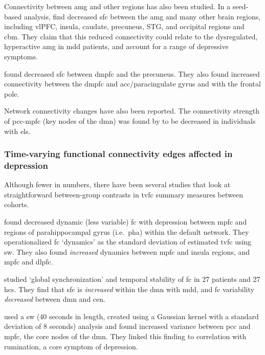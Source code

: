 Connectivity between \gls{amg} and other regions has also been studied.
In a seed-based analysis, \textcite{Ramasubbu2014} find decreased \gls{sfc} between the \gls{amg} and many other brain regions, including vlPFC, insula, caudate, precuneus, STG, and occipital regions and \gls{cbm}.
They claim that this reduced connectivity could relate to the dysregulated, hyperactive \gls{amg} in \gls{mdd} patients, and account for a range of depressive symptoms.

\textcite{Rzepa2018} found decreased \gls{sfc} between \gls{dmpfc} and the precuneus.
They also found increased connectivity between the \gls{dmpfc} and \gls{acc}/paracingulate gyrus and with the frontal pole.

Network connectivity changes have also been reported.
The connectivity strength of \gls{pcc}-\gls{mpfc} (key nodes of the \gls{dmn}) was found by \textcite{Philip2013} to be decreased in individuals with \gls{els}.

\subsubsection{Time-varying functional connectivity edges affected in depression}

Although fewer in numbers, there have been several studies that look at straightforward between-group contrasts in \gls{tvfc} summary measures between cohorts.

\textcite{Kaiser2015} found decreased dynamic (less variable) \gls{fc} with depression between \gls{mpfc} and regions of parahippocampal gyrus (i.e.~\gls{pha}) within the default network.
They operationalized \gls{fc} `dynamics' as the standard deviation of estimated \gls{tvfc} using \gls{sw}.
They also found \emph{increased} dynamics between \gls{mpfc} and insula regions, and \gls{mpfc} and \gls{dlpfc}.

\textcite{Demirtas2016} studied `global synchronization' and temporal stability of \gls{fc} in 27 patients and 27 \glspl{hc}.
They find that \gls{sfc} is \emph{increased} within the \gls{dmn} with \gls{mdd}, and \gls{fc} variability \emph{decreased} between \gls{dmn} and \gls{cen}.

\textcite{Wise2017} used a \gls{sw} (40 seconds in length, created using a Gaussian kernel with a standard deviation of 8 seconds) analysis and found increased variance between \gls{pcc} and \gls{mpfc}, the core nodes of the \gls{dmn}.
They linked this finding to correlation with rumination, a core symptom of depression.

